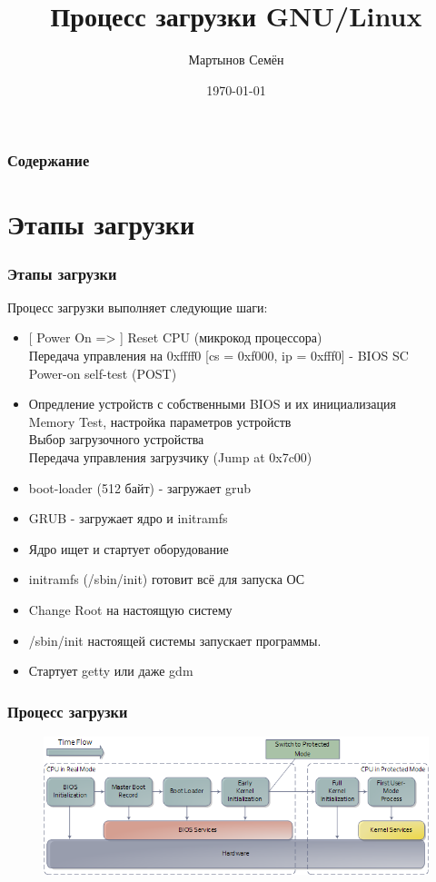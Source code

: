 \documentclass{beamer}
\title[Системное программирование]{Процесс загрузки GNU/Linux}
\author{Мартынов Семён}
\institute[СПб ПУ]
{
Санкт-Петербургский политехнический университет Петра Великого\\
\medskip
\textit{semen.martynov@gmail.com}
}
\date{\today}
\begin{document}
\begin{frame}
\titlepage
\end{frame}

\begin{frame}
\frametitle{Содержание}
\tableofcontents
\end{frame}

\section{Этапы загрузки}

\begin{frame}
\frametitle{Этапы загрузки}

Процесс загрузки выполняет следующие шаги:
\begin{itemize}
\item{[ Power On => ] Reset CPU (микрокод процессора) \\
Передача управления на 0xffff0 [cs = 0xf000, ip = 0xfff0] - BIOS SC\\
Power-on self-test (POST)}
\pause
\item{Опредление устройств с собственными BIOS и их инициализация\\
Memory Test, настройка параметров устройств\\
Выбор загрузочного устройства\\
Передача управления загрузчику (Jump at 0x7c00)}
\pause
\item boot-loader (512 байт) - загружает grub
\pause
\item GRUB - загружает ядро и initramfs
\pause
\item Ядро ищет и стартует оборудование
\pause
\item initramfs (/sbin/init) готовит всё для запуска ОС
\pause
\item Change Root на настоящую систему
\pause
\item /sbin/init настоящей системы запускает программы.
\pause
\item Стартует getty или даже gdm
\end{itemize}

\end{frame}


\begin{frame}
\frametitle{Процесс загрузки}

\begin{figure}
\includegraphics[scale=0.5]{res/bootProcess}
\end{figure}

\end{frame}
\end{document}
